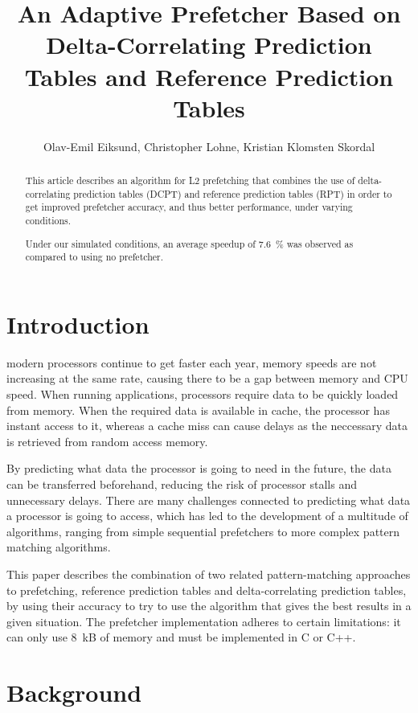 \documentclass[journal,a4paper]{IEEEtran}
\begin{document}
\title{An Adaptive Prefetcher Based on Delta-Correlating Prediction Tables and Reference Prediction Tables}
\author{Olav-Emil Eiksund, Christopher Lohne, Kristian Klomsten Skordal}
\maketitle

\begin{abstract}
This article describes an algorithm for L2 prefetching that combines the use of
delta-correlating prediction tables (DCPT) and reference prediction tables (RPT)
in order to get improved prefetcher accuracy, and thus better performance, under
varying conditions.

Under our simulated conditions, an average speedup of 7.6~\% was observed as
compared to using no prefetcher.
\end{abstract}

\section{Introduction}
 modern processors continue to get faster each year, memory speeds are not
increasing at the same rate, causing there to be a gap between memory and CPU speed.
When running applications, processors require data to be quickly
loaded from memory. When the required data is available in cache, the processor
has instant access to it, whereas a cache miss can cause delays as the neccessary
data is retrieved from random access memory.

By predicting what data the processor is going to need in the future, the
data can be transferred beforehand, reducing the risk of processor stalls and
unnecessary delays. There are many challenges connected to predicting what
data a processor is going to access, which has led to the development of a
multitude of algorithms, ranging from simple sequential prefetchers to more
complex pattern matching algorithms.

This paper describes the combination of two related pattern-matching approaches
to prefetching, reference prediction tables and delta-correlating prediction
tables, by using their accuracy to try to use the algorithm that gives the best
results in a given situation. The prefetcher implementation adheres to certain
limitations: it can only use 8~kB of memory and must be implemented in C or C++.

\section{Background}
\end{document}
